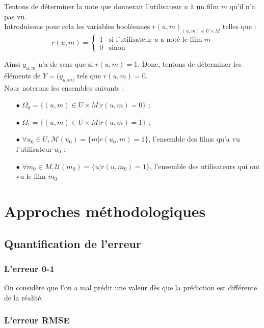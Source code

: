 \documentclass[a4paper, 11pt]{book}
\begin{document}
Tentons de déterminer la note que donnerait l'utilisateur $u$ à un film $m$ qu'il n'a pas vu. \\
Introduisons pour cela les variables booléennes $r(u,m)_{(u, m) \in U \times M}$ telles que :\\
$$r(u,m) = 
\left\{
\begin{array}{ll}
1 & \text{si l'utilisateur } u \text{ a noté le film } m \\
0  & \text{sinon} \
\end{array}
\right.$$
\medskip 

Ainsi $y_{u,m}$ n'a de sens que si $r(u,m) =1$. Donc, tentons de déterminer les éléments de $Y=(y_{u,m)}$ tels que $r(u,m)=0$. \\

Nous noterons les ensembles suivants : 
\begin{itemize}
\item[$\bullet$]  $\Omega_0 = \{(u,m) \in U \times M | r(u,m) = 0 \}$ ;
\item[$\bullet$]  $\Omega_1 = \{(u,m) \in U \times M | r(u,m) = 1\}$ ;
\item[$\bullet$]  $\forall u_0 \in U, \mathcal{M}(u_0) = \{m | r(u_0,m) = 1 \}$, l'ensemble des films qu'a vu l'utilisateur $u_0$ ;
\item[$\bullet$]  $\forall m_0 \in M, \mathcal{U}(m_0) = \{u | r(u,m_0) = 1 \}$, l'ensemble des utilisateurs qui ont vu le film $m_0$
\end{itemize}

\chapter{Approches méthodologiques}

\section{Quantification de l'erreur}

\subsection{L'erreur 0-1}

On considère que l'on a mal prédit une valeur dès que la prédiction est différente de la réalité.

\subsection{L'erreur RMSE}
\end{document}
